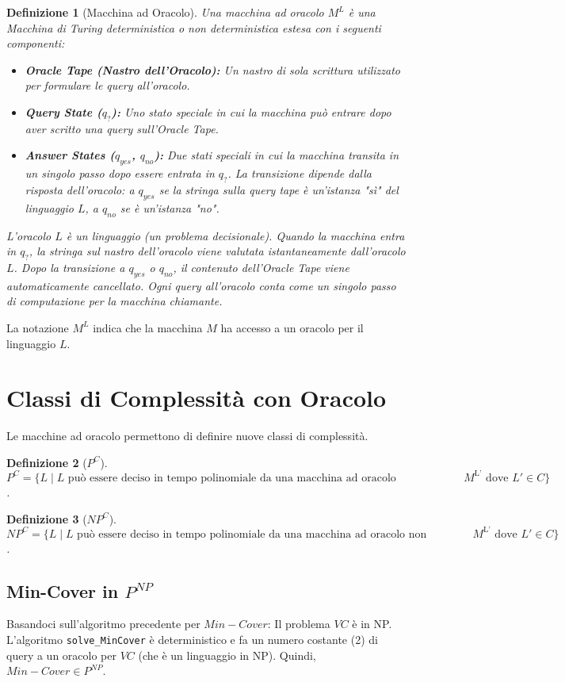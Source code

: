 \documentclass[a4paper]{article}
\newtheorem{definition}{Definizione}
\begin{document}
\begin{definition}[Macchina ad Oracolo]
Una macchina ad oracolo $M^L$ è una Macchina di Turing deterministica o non deterministica estesa con i seguenti componenti:
\begin{itemize}
    \item \textbf{Oracle Tape (Nastro dell'Oracolo):} Un nastro di sola scrittura utilizzato per formulare le query all'oracolo.
    \item \textbf{Query State ($q_?$):} Uno stato speciale in cui la macchina può entrare dopo aver scritto una query sull'Oracle Tape.
    \item \textbf{Answer States ($q_{yes}$, $q_{no}$):} Due stati speciali in cui la macchina transita in un singolo passo dopo essere entrata in $q_?$. La transizione dipende dalla risposta dell'oracolo: a $q_{yes}$ se la stringa sulla query tape è un'istanza "sì" del linguaggio $L$, a $q_{no}$ se è un'istanza "no".
\end{itemize}
L'oracolo $L$ è un linguaggio (un problema decisionale). Quando la macchina entra in $q_?$, la stringa sul nastro dell'oracolo viene valutata istantaneamente dall'oracolo $L$. Dopo la transizione a $q_{yes}$ o $q_{no}$, il contenuto dell'Oracle Tape viene automaticamente cancellato. Ogni query all'oracolo conta come un singolo passo di computazione per la macchina chiamante.
\end{definition}
La notazione $M^L$ indica che la macchina $M$ ha accesso a un oracolo per il linguaggio $L$.

\section{Classi di Complessità con Oracolo}
Le macchine ad oracolo permettono di definire nuove classi di complessità.
\begin{definition}[$P^C$]
$P^C = \{ L \mid L \text{ può essere deciso in tempo polinomiale da una macchina ad oracolo deterministica } M^{\text{L'}} \text{ dove } L' \in C \}$.
\end{definition}
\begin{definition}[$NP^C$]
$NP^C = \{ L \mid L \text{ può essere deciso in tempo polinomiale da una macchina ad oracolo non deterministica } M^{\text{L'}} \text{ dove } L' \in C \}$.
\end{definition}

\subsection{Min-Cover in $P^{NP}$}
Basandoci sull'algoritmo precedente per $Min-Cover$:
Il problema $VC$ è in NP. L'algoritmo \texttt{solve\_MinCover} è deterministico e fa un numero costante (2) di query a un oracolo per $VC$ (che è un linguaggio in NP).
Quindi, $Min-Cover \in P^{NP}$.
\end{document}
